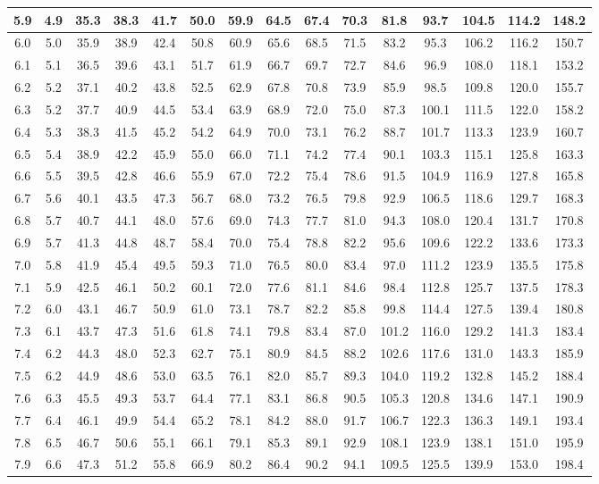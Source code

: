 \begin{footnotesize}
\begin{tabular}{c | c | c | c | c | c | c | c | c | c | c | c | c | c | c}
		5.9&4.9&35.3&38.3&41.7&50.0&59.9&64.5&67.4&70.3&81.8&93.7&104.5&114.2&148.2\\\hline
		6.0&5.0&35.9&38.9&42.4&50.8&60.9&65.6&68.5&71.5&83.2&95.3&106.2&116.2&150.7\\\hline
		6.1&5.1&36.5&39.6&43.1&51.7&61.9&66.7&69.7&72.7&84.6&96.9&108.0&118.1&153.2\\\hline
		6.2&5.2&37.1&40.2&43.8&52.5&62.9&67.8&70.8&73.9&85.9&98.5&109.8&120.0&155.7\\\hline
		6.3&5.2&37.7&40.9&44.5&53.4&63.9&68.9&72.0&75.0&87.3&100.1&111.5&122.0&158.2\\\hline
		6.4&5.3&38.3&41.5&45.2&54.2&64.9&70.0&73.1&76.2&88.7&101.7&113.3&123.9&160.7\\\hline
		6.5&5.4&38.9&42.2&45.9&55.0&66.0&71.1&74.2&77.4&90.1&103.3&115.1&125.8&163.3\\\hline
		6.6&5.5&39.5&42.8&46.6&55.9&67.0&72.2&75.4&78.6&91.5&104.9&116.9&127.8&165.8\\\hline
		6.7&5.6&40.1&43.5&47.3&56.7&68.0&73.2&76.5&79.8&92.9&106.5&118.6&129.7&168.3\\\hline
		6.8&5.7&40.7&44.1&48.0&57.6&69.0&74.3&77.7&81.0&94.3&108.0&120.4&131.7&170.8\\\hline
		6.9&5.7&41.3&44.8&48.7&58.4&70.0&75.4&78.8&82.2&95.6&109.6&122.2&133.6&173.3\\\hline
		7.0&5.8&41.9&45.4&49.5&59.3&71.0&76.5&80.0&83.4&97.0&111.2&123.9&135.5&175.8\\\hline
		7.1&5.9&42.5&46.1&50.2&60.1&72.0&77.6&81.1&84.6&98.4&112.8&125.7&137.5&178.3\\\hline
		7.2&6.0&43.1&46.7&50.9&61.0&73.1&78.7&82.2&85.8&99.8&114.4&127.5&139.4&180.8\\\hline
		7.3&6.1&43.7&47.3&51.6&61.8&74.1&79.8&83.4&87.0&101.2&116.0&129.2&141.3&183.4\\\hline
		7.4&6.2&44.3&48.0&52.3&62.7&75.1&80.9&84.5&88.2&102.6&117.6&131.0&143.3&185.9\\\hline
		7.5&6.2&44.9&48.6&53.0&63.5&76.1&82.0&85.7&89.3&104.0&119.2&132.8&145.2&188.4\\\hline
		7.6&6.3&45.5&49.3&53.7&64.4&77.1&83.1&86.8&90.5&105.3&120.8&134.6&147.1&190.9\\\hline
		7.7&6.4&46.1&49.9&54.4&65.2&78.1&84.2&88.0&91.7&106.7&122.3&136.3&149.1&193.4\\\hline
		7.8&6.5&46.7&50.6&55.1&66.1&79.1&85.3&89.1&92.9&108.1&123.9&138.1&151.0&195.9\\\hline
		7.9&6.6&47.3&51.2&55.8&66.9&80.2&86.4&90.2&94.1&109.5&125.5&139.9&153.0&198.4\\\hline

\end{tabular}
\end{footnotesize}
